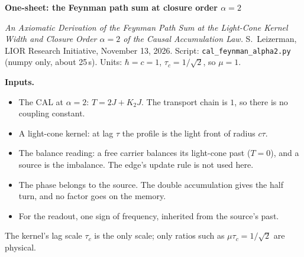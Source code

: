\documentclass[10pt]{article}
\begin{document}
{\Large\bfseries One-sheet: the Feynman path sum at closure order $\alpha=2$}\par
\textit{An Axiomatic Derivation of the Feynman Path Sum at the Light-Cone Kernel Width and Closure Order $\alpha=2$ of the Causal Accumulation Law.} S.~Leizerman, LIOR Research Initiative, November 13, 2026. Script: \texttt{cal\_feynman\_alpha2.py} (numpy only, about 25\,s). Units: $\hbar=c=1$, $\tau_c=1/\sqrt2$, so $\mu=1$.

\textbf{Inputs.}
\begin{itemize}\setlength{\itemsep}{0pt}
\item The CAL at $\alpha=2$: $T=2J+K_2J$. The transport chain is $1$, so there is no coupling constant.
\item A light-cone kernel: at lag $\tau$ the profile is the light front of radius $c\tau$.
\item The balance reading: a free carrier balances its light-cone past ($T=0$), and a source is the imbalance. The edge's update rule is not used here.
\item The phase belongs to the source. The double accumulation gives the half turn, and no factor goes on the memory.
\item For the readout, one sign of frequency, inherited from the source's past.
\end{itemize}
The kernel's lag scale $\tau_c$ is the only scale; only ratios such as $\mu\tau_c=1/\sqrt2$ are physical.
\end{document}
